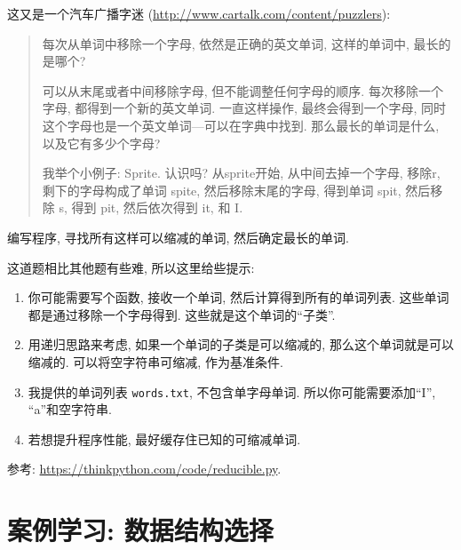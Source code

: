 \documentclass[10pt]{book}
\begin{document}
\begin{exercise}

这又是一个汽车广播字迷
(\url{http://www.cartalk.com/content/puzzlers}):

\begin{quote}
每次从单词中移除一个字母, 依然是正确的英文单词, 这样的单词中, 
最长的是哪个?

可以从末尾或者中间移除字母, 但不能调整任何字母的顺序. 
每次移除一个字母, 都得到一个新的英文单词. 一直这样操作, 
最终会得到一个字母, 同时这个字母也是一个英文单词---可以在字典中找到. 
那么最长的单词是什么, 以及它有多少个字母?

我举个小例子: Sprite. 认识吗? 从sprite开始, 从中间去掉一个字母, 移除r, 剩下的字母构成了单词 spite, 
然后移除末尾的字母, 得到单词 spit, 然后移除 s, 得到 pit, 然后依次得到 it, 和 I. 
\end{quote}

编写程序, 寻找所有这样可以缩减的单词, 然后确定最长的单词. 

这道题相比其他题有些难, 所以这里给些提示:

\begin{enumerate}

\item 你可能需要写个函数, 接收一个单词, 然后计算得到所有的单词列表. 
这些单词都是通过移除一个字母得到. 这些就是这个单词的``子类''.

\item 用递归思路来考虑, 如果一个单词的子类是可以缩减的, 
那么这个单词就是可以缩减的. 可以将空字符串可缩减, 作为基准条件. 

\item 我提供的单词列表 {\tt words.txt}, 不包含单字母单词. 所以你可能需要添加``I'', ``a''和空字符串. 

\item 若想提升程序性能, 最好缓存住已知的可缩减单词. 

\end{enumerate}

参考: \url{https://thinkpython.com/code/reducible.py}.

\end{exercise}




\chapter{案例学习: 数据结构选择}
\end{document}
